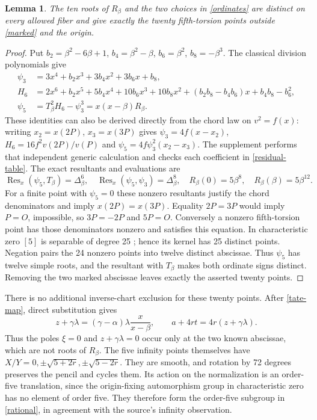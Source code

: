 \documentclass[11pt]{article}
\newtheorem{lemma}{Lemma}
\newcommand{\Res}{\operatorname{Res}}
\begin{document}
\begin{lemma}\label{complete}
The ten roots of $R_\beta$ and the two choices in \eqref{ordinates}
are distinct on every allowed fiber and give exactly the twenty
fifth-torsion points outside \eqref{marked} and the origin.
\end{lemma}
\begin{proof}
Put $b_2=\beta^2-6\beta+1$, $b_4=\beta^2-\beta$, $b_6=\beta^2$,
$b_8=-\beta^3$. The classical division polynomials give
\begin{align*}
\psi_3&=3x^4+b_2x^3+3b_4x^2+3b_6x+b_8,\\
H_6&=2x^6+b_2x^5+5b_4x^4+10b_6x^3+10b_8x^2
 +(b_2b_8-b_4b_6)x+b_4b_8-b_6^2,\\
\psi_5&=T_\beta^2H_6-\psi_3^3=x(x-\beta)R_\beta.
\end{align*}
These identities can also be derived directly from the chord law on
$v^2=f(x)$: writing $x_2=x(2P)$, $x_3=x(3P)$ gives
$\psi_3=4f(x-x_2)$, $H_6=16f^2v(2P)/v(P)$ and
$\psi_5=4f\psi_3^2(x_2-x_3)$. The supplement performs that independent
generic calculation and checks each coefficient in \eqref{residual-table}.
The exact resultants and evaluations are
\[
\Res_x(\psi_5,T_\beta)=\Delta_\beta^6,\quad
\Res_x(\psi_5,\psi_3)=\Delta_\beta^8,\quad
R_\beta(0)=5\beta^8,\quad R_\beta(\beta)=5\beta^{12}.
\]
For a finite point with $\psi_5=0$ these nonzero resultants justify
the chord denominators and imply $x(2P)=x(3P)$. Equality $2P=3P$
would imply $P=O$, impossible, so $3P=-2P$ and $5P=O$.
Conversely a nonzero fifth-torsion point has those denominators nonzero
and satisfies this equation. In characteristic zero $[5]$ is separable
of degree 25 \cite[sections 5.5--5.6]{sutherland}; hence its kernel has
25 distinct points. Negation pairs the 24 nonzero points into twelve
distinct abscissae. Thus $\psi_5$ has twelve simple roots, and the
resultant with $T_\beta$ makes both ordinate signs distinct. Removing
the two marked abscissae leaves exactly the asserted twenty points.
\end{proof}

There is no additional inverse-chart exclusion for these twenty points.
After \eqref{tate-map}, direct substitution gives
\[
z+\gamma\lambda=(\gamma-\alpha)\lambda\frac{x}{x-\beta},
\qquad a+4rt=4r(z+\gamma\lambda).
\]
Thus the poles $\xi=0$ and $z+\gamma\lambda=0$ occur only at the two
known abscissae, which are not roots of $R_\beta$. The five infinity
points themselves have $X/Y=0,\pm\sqrt{5+2r},\pm\sqrt{5-2r}$.
They are smooth, and rotation by 72 degrees preserves the pencil and
cycles them. Its action on the normalization is an order-five
translation, since the origin-fixing automorphism group in
characteristic zero has no element of order five. They therefore form
the order-five subgroup in \eqref{rational}, in agreement with the
source's infinity observation.
\end{document}

